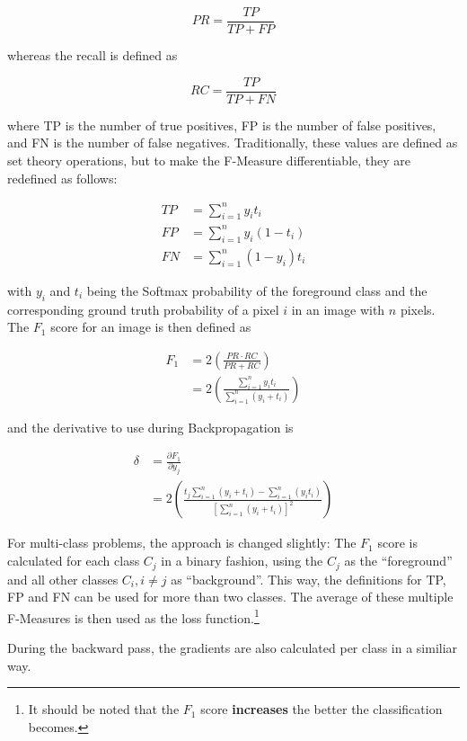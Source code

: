 \[ PR = \frac{TP}{TP + FP} \]

\noindent whereas the recall is defined as

\[ RC = \frac{TP}{TP + FN} \]

\noindent where TP is the number of true positives, FP is the number of false positives, and FN is the number of false negatives. Traditionally, these values are defined as set theory operations, but to make the F-Measure differentiable, they are redefined as follows:

\begin {align}
TP &= \sum \limits_{i=1}^{n} y_i t_i \\
FP &= \sum  \limits_{i=1}^{n} y_i (1 - t_i) \\
FN &= \sum \limits_{i=1}^{n} (1 - y_i) t_i
\end {align}

\noindent with $y_i$ and $t_i$ being the Softmax probability of the foreground class and the corresponding ground truth probability of a pixel $i$ in an image with $n$ pixels. The $F_1$ score for an image is then defined as

\begin {align}
 	F_1 &= 2 \left ( \frac{PR \cdot RC}{PR + RC} \right ) \\
		&= 2 \left ( \frac{\sum_{i=1}^{n} y_i t_i }{ \sum_{i=1}^{n} (y_i + t_i) } \right )
\end {align}

\noindent and the derivative to use during Backpropagation is

\begin {align}
	\delta &= \frac{\partial F_1}{\partial y_j}\\
	&= 2 \left ( \frac{t_j \sum_{i=1}^{n} \left ( y_i + t_i \right ) - \sum_{i=1}^{n} \left ( y_i t_i \right )  }{\left [ \sum_{i=1}^{n} \left ( y_i + t_i \right ) \right ]^2 } \right )
\end {align}

\noindent For multi-class problems, the approach is changed slightly: The $F_1$ score is calculated for each class $C_j$ in a binary fashion, using the $C_j$ as the ``foreground'' and all other classes $C_i, i \neq j$ as ``background''. This way, the definitions for TP, FP and FN can be used for more than two classes. The average of these multiple F-Measures is then used as the loss function.\footnote{It should be noted that the $F_1$ score \textbf{increases} the better the classification becomes.}

During the backward pass, the gradients are also calculated per class in a similiar way.


